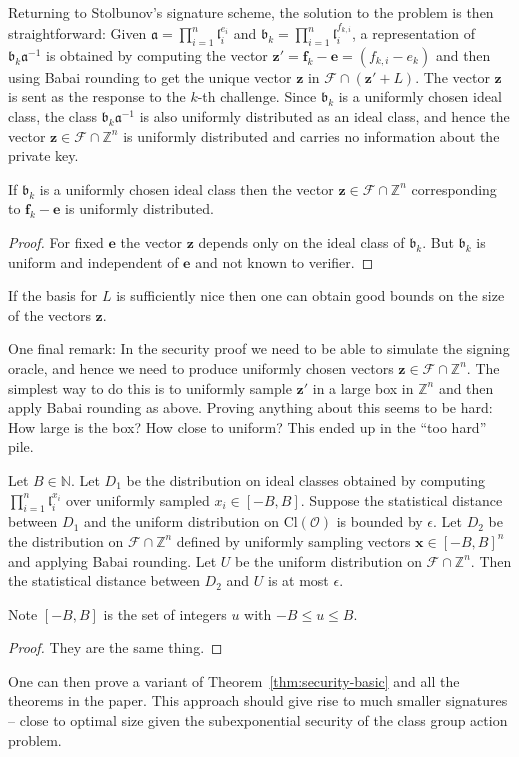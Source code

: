 \documentclass{llncs}
\newcommand{\FF}{\mathcal{F}}
\newcommand{\N}{\mathbb{N}}
\newcommand{\OO}{\mathcal{O}}
\newcommand{\Z}{\mathbb{Z}}
\newcommand{\Cl}{\text{Cl}}
\renewcommand{\a}{\mathfrak{a}}
\renewcommand{\b}{\mathfrak{b}}
\renewcommand{\l}{\mathfrak{l}}
\newcommand{\e}{\textbf{e}}
\newcommand{\f}{\textbf{f}}
\newcommand{\x}{\textbf{x}}
\newcommand{\z}{\textbf{z}}
\begin{document}
Returning to Stolbunov's signature scheme, the solution to the problem is then straightforward:
Given $\a = \prod_{i=1}^n \l_i^{e_i}$ and $\b_k = \prod_{i=1}^n \l_i^{f_{k,i}}$,
a representation of $\b_k \a^{-1}$ is obtained by computing the vector $\z' = \f_k - \e = (f_{k,i} - e_k)$
and then using Babai rounding to get the unique vector $\z$ in $\FF \cap (\z' + L )$.
The vector $\z$ is sent as the response to the $k$-th challenge.
Since $\b_k$ is a uniformly chosen ideal class, the class $\b_k \a^{-1}$ is also uniformly distributed as an ideal class, and hence the vector $\z \in \FF \cap \Z^n$ is uniformly distributed and carries no information about the private key.

\begin{lemma}
If $\b_k$ is a uniformly chosen ideal class then the vector 
$\z \in \FF \cap \Z^n$ corresponding to $\f_k - \e$ is uniformly distributed.
\end{lemma}

\begin{proof}
For fixed $\e$ the vector $\z$ depends only on the ideal class of $\b_k$.
But $\b_k$ is uniform and independent of $\e$ and not known to verifier.
\end{proof}



If the basis for $L$ is sufficiently nice then one can obtain good bounds on the size of the vectors $\z$.

One final remark: In the security proof we need to be able to simulate the signing oracle, and hence we need to produce uniformly chosen vectors $\z \in \FF \cap \Z^n$.
The simplest way to do this is to uniformly sample $\z'$ in a large box in $\Z^n$ and then apply Babai rounding as above.
Proving anything about this seems to be hard: How large is the box? How close to uniform?
This ended up in the ``too hard'' pile.


\begin{lemma} \label{lem:sim1}
Let $B \in \N$. Let $D_1$ be the distribution on ideal classes obtained by computing $\prod_{i=1}^n \l_i^{x_i}$ over uniformly sampled $x_i \in [-B,B]$.
Suppose the statistical distance between $D_1$ and the uniform distribution on $\Cl(\OO)$ is bounded by $\epsilon$.
Let $D_2$ be the distribution on $\FF \cap \Z^n$ defined by uniformly sampling vectors $\x \in [-B,B]^n$ and applying Babai rounding.
Let $U$ be the uniform distribution on $\FF \cap \Z^n$.
Then the statistical distance between $D_2$ and $U$ is at most $\epsilon$.
\end{lemma}

Note $[-B,B]$ is the set of integers $u$ with $-B \le u \le B$.


\begin{proof}
They are the same thing.
\end{proof}


One can then prove a variant of Theorem~\ref{thm:security-basic} and all the theorems in the paper. This approach should give rise to much smaller signatures -- close to optimal size given the subexponential security of the class group action problem.
\end{document}
